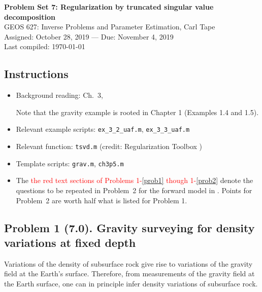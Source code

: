 \documentclass[11pt,titlepage,fleqn]{article}
\begin{document}

\begin{spacing}{1.2}
\centering
{\large \bf Problem Set 7: Regularization by truncated singular value decomposition} \\
GEOS 627: Inverse Problems and Parameter Estimation, Carl Tape \\
Assigned: October 28, 2019 --- Due: November 4, 2019 \\
Last compiled: \today
\end{spacing}


\subsection*{Instructions}

\begin{itemize}
\item Background reading: Ch.~3, \citet{AsterE2}

Note that the gravity example is rooted in Chapter 1 (Examples 1.4 and 1.5).

\item Relevant example scripts: \verb+ex_3_2_uaf.m+, \verb+ex_3_3_uaf.m+
\item Relevant function: \verb+tsvd.m+ (credit: Regularization Toolbox \citep{Hansen})
\item Template scripts: \verb+grav.m+, \verb+ch3p5.m+
\item The \textcolor{red}{the red text sections of Problems 1-\ref{prob1} though 1-\ref{prob2}} denote the questions to be repeated in Problem~2 for the forward model in . Points for Problem~2 are worth half what is listed for Problem 1.
\end{itemize}


\subsection*{Problem 1 (7.0). Gravity surveying for density variations at fixed depth}

Variations of the density of subsurface rock give rise to variations of the gravity field at the Earth's surface. Therefore, from measurements of the gravity field at the Earth surface, one can in principle infer density variations of subsurface rock.
\end{document}

